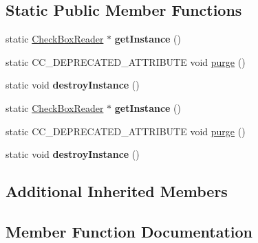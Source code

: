 \subsection*{Static Public Member Functions}
\begin{DoxyCompactItemize}
\item 
\mbox{\label{classcocostudio_1_1CheckBoxReader_ad9208f84101d26ad8ec403ba2508e7f8}} 
static \hyperlink{classcocostudio_1_1CheckBoxReader}{Check\+Box\+Reader} $\ast$ {\bfseries get\+Instance} ()
\item 
static C\+C\+\_\+\+D\+E\+P\+R\+E\+C\+A\+T\+E\+D\+\_\+\+A\+T\+T\+R\+I\+B\+U\+TE void \hyperlink{classcocostudio_1_1CheckBoxReader_a8041d3dbb7e46c479f59a36ca18a5a08}{purge} ()
\item 
\mbox{\label{classcocostudio_1_1CheckBoxReader_af88df551cc6c61606bd63d4f7102bc97}} 
static void {\bfseries destroy\+Instance} ()
\item 
\mbox{\label{classcocostudio_1_1CheckBoxReader_adf5e2417780e03b7c4c39774de07371a}} 
static \hyperlink{classcocostudio_1_1CheckBoxReader}{Check\+Box\+Reader} $\ast$ {\bfseries get\+Instance} ()
\item 
static C\+C\+\_\+\+D\+E\+P\+R\+E\+C\+A\+T\+E\+D\+\_\+\+A\+T\+T\+R\+I\+B\+U\+TE void \hyperlink{classcocostudio_1_1CheckBoxReader_a8041d3dbb7e46c479f59a36ca18a5a08}{purge} ()
\item 
\mbox{\label{classcocostudio_1_1CheckBoxReader_a4473845e515f7c1dbdea84209d0ce838}} 
static void {\bfseries destroy\+Instance} ()
\end{DoxyCompactItemize}
\subsection*{Additional Inherited Members}


\subsection{Member Function Documentation}
\mbox{\label{classcocostudio_1_1CheckBoxReader_a8041d3dbb7e46c479f59a36ca18a5a08}} 
